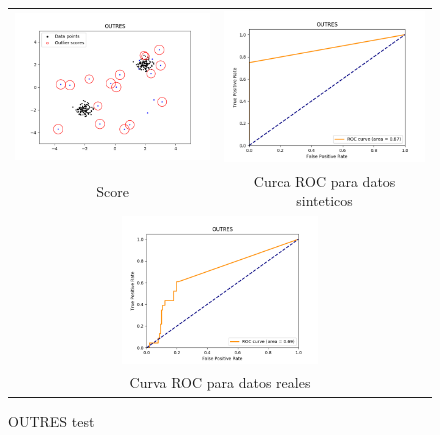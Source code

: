 \begin{figure}[H]
    \begin{tabular}{cc}
      \includegraphics[width=65mm,height=40mm]{imagenes/outres-sintetico.png} &   \includegraphics[width=65mm,height=40mm]{imagenes/outres-sintetic-roc.png} \\
    Score & Curca ROC para datos sinteticos \\[6pt]
    \multicolumn{2}{c}{\includegraphics[width=65mm,height=39mm]{imagenes/outres-test.png} }\\
    \multicolumn{2}{c}{Curva ROC para datos reales}\\
    \end{tabular}
    \caption{\label{fig:outrestest} OUTRES test}
\end{figure}

